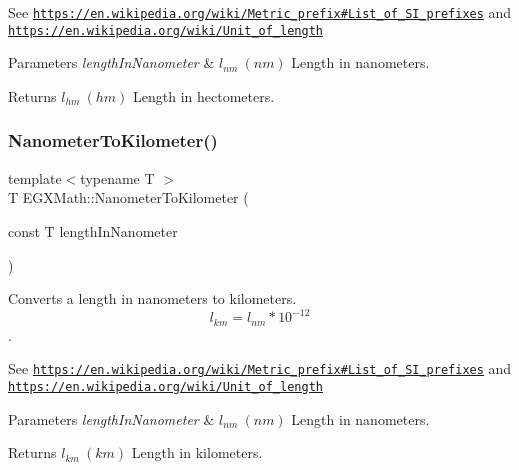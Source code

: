 See \href{https://en.wikipedia.org/wiki/Metric_prefix#List_of_SI_prefixes}{\tt https\+://en.\+wikipedia.\+org/wiki/\+Metric\+\_\+prefix\#\+List\+\_\+of\+\_\+\+S\+I\+\_\+prefixes} and \href{https://en.wikipedia.org/wiki/Unit_of_length}{\tt https\+://en.\+wikipedia.\+org/wiki/\+Unit\+\_\+of\+\_\+length} 
\begin{DoxyParams}{Parameters}
{\em length\+In\+Nanometer} & $ l_{nm}\ (nm)$ Length in nanometers. \\
\hline
\end{DoxyParams}
\begin{DoxyReturn}{Returns}
$ l_{hm}\ (hm)$ Length in hectometers. 
\end{DoxyReturn}
\mbox{\label{group___e_g_x_math-_conversions-_length_conversions-_s_i-_nanometer-_s_i_gaadb5b2460069bb749412818e7aa6ee3b}} 
\subsubsection{\texorpdfstring{Nanometer\+To\+Kilometer()}{NanometerToKilometer()}}
{\footnotesize\ttfamily template$<$typename T $>$ \\
T E\+G\+X\+Math\+::\+Nanometer\+To\+Kilometer (\begin{DoxyParamCaption}\item[{const T}]{length\+In\+Nanometer }\end{DoxyParamCaption})}



Converts a length in nanometers to kilometers. \[ l_{km}=l_{nm} * 10^{-12} \]. 

See \href{https://en.wikipedia.org/wiki/Metric_prefix#List_of_SI_prefixes}{\tt https\+://en.\+wikipedia.\+org/wiki/\+Metric\+\_\+prefix\#\+List\+\_\+of\+\_\+\+S\+I\+\_\+prefixes} and \href{https://en.wikipedia.org/wiki/Unit_of_length}{\tt https\+://en.\+wikipedia.\+org/wiki/\+Unit\+\_\+of\+\_\+length} 
\begin{DoxyParams}{Parameters}
{\em length\+In\+Nanometer} & $ l_{nm}\ (nm)$ Length in nanometers. \\
\hline
\end{DoxyParams}
\begin{DoxyReturn}{Returns}
$ l_{km}\ (km)$ Length in kilometers. 
\end{DoxyReturn}
\mbox{\label{group___e_g_x_math-_conversions-_length_conversions-_s_i-_nanometer-_s_i_gabe3584b4139cea97ebc372abf99fc63e}} 
